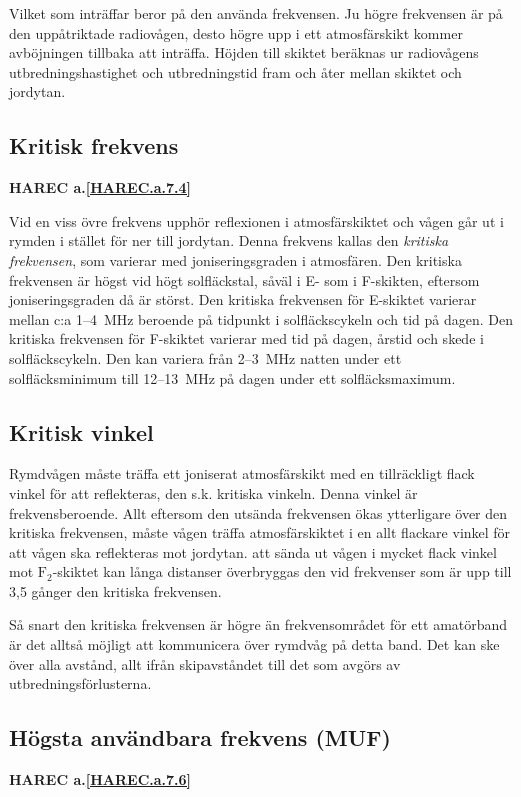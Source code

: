 Vilket som inträffar beror på den använda frekvensen. Ju högre
frekvensen är på den uppåtriktade radiovågen, desto högre upp i ett
atmosfärskikt kommer avböjningen tillbaka att inträffa. Höjden till
skiktet beräknas ur radiovågens utbredningshastighet och
utbredningstid fram och åter mellan skiktet och jordytan.

\subsection{Kritisk frekvens}
\textbf{
HAREC a.\ref{HAREC.a.7.4}\label{myHAREC.a.7.4}
}

Vid en viss övre frekvens upphör reflexionen i atmosfärskiktet och
vågen går ut i rymden i stället för ner till jordytan. Denna frekvens
kallas den \emph{kritiska frekvensen}, som varierar med
joniseringsgraden i atmosfären. Den kritiska frekvensen är högst vid
högt solfläckstal, såväl i E- som i F-skikten, eftersom
joniseringsgraden då är störst. Den kritiska frekvensen för E-skiktet
varierar mellan c:a 1--4~MHz beroende på tidpunkt i solfläckscykeln
och tid på dagen. Den kritiska frekvensen för F-skiktet varierar med
tid på dagen, årstid och skede i solfläckscykeln.  Den kan variera
från 2--3~MHz natten under ett solfläcksminimum till 12--13~MHz på
dagen under ett solfläcksmaximum.

\subsection{Kritisk vinkel}

Rymdvågen måste träffa ett joniserat atmosfärskikt med en tillräckligt
flack vinkel för att reflekteras, den s.k. kritiska vinkeln. Denna
vinkel är frekvensberoende. Allt eftersom den utsända frekvensen ökas
ytterligare över den kritiska frekvensen, måste vågen träffa
atmosfärskiktet i en allt flackare vinkel för att vågen ska
reflekteras mot jordytan.  att sända ut vågen i mycket flack vinkel
mot \(\mathrm{F_2}\)-skiktet kan långa distanser överbryggas den vid
frekvenser som är upp till 3,5 gånger den kritiska frekvensen.

Så snart den kritiska frekvensen är högre än frekvensområdet för ett
amatörband är det alltså möjligt att kommunicera över rymdvåg på detta
band. Det kan ske över alla avstånd, allt ifrån skipavståndet till det
som avgörs av utbredningsförlusterna.

\subsection{Högsta användbara frekvens (MUF)}
\textbf{
HAREC a.\ref{HAREC.a.7.6}\label{myHAREC.a.7.6}
}

